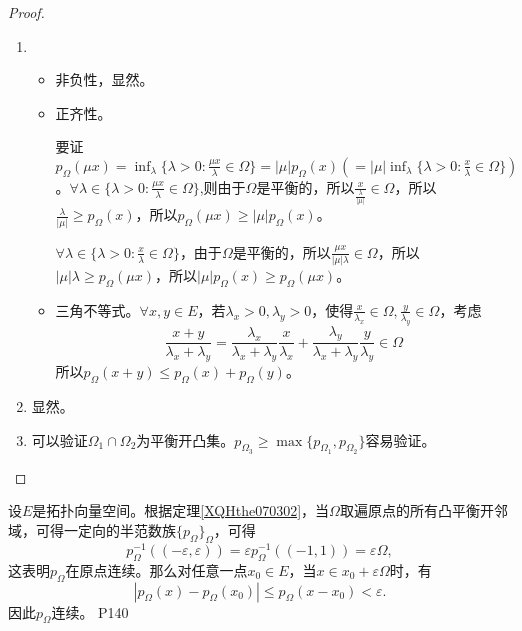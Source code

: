 \begin{proof}
	\begin{enumerate}
		\item \begin{itemize}
			\item 非负性，显然。
			\item 正齐性。\par
			要证$p_{\Omega}(\mu x) =\inf_{\lambda}\{\lambda>0:\frac{\mu x}{\lambda}\in \Omega \}=|\mu|p_{\Omega}(x)(=|\mu|\inf_{\lambda}\{\lambda>0:\frac{x}{\lambda}\in \Omega\})$。$\forall \lambda \in \{\lambda>0: \frac{\mu x}{\lambda}\in \Omega\} $,则由于$\Omega $是平衡的，所以$\frac{x}{\frac{\lambda}{|\mu|}} \in \Omega$，所以$\frac{\lambda}{|\mu|} \geq p_{\Omega}(x)$，所以$p_{\Omega}(\mu x)\geq |\mu|p_{\Omega}(x) $。\par
			$\forall \lambda\in \{\lambda>0:\frac{x}{\lambda}\in \Omega\} $，由于$\Omega $是平衡的，所以$\frac{\mu x}{|\mu|\lambda}\in \Omega $，所以$|\mu|\lambda\geq p_{\Omega}(\mu x) $，所以$|\mu|p_{\Omega}(x)\geq p_{\Omega}(\mu x) $。
			\item 三角不等式。$\forall x,y\in E $，若$\lambda_{x}>0,\lambda_{y}>0$，使得$\frac{x}{\lambda_{x}}\in \Omega,\frac{y}{\lambda_{y}}\in \Omega $，考虑
			\begin{equation*}
				\frac{x+y}{\lambda_{x}+\lambda_{y}}=\frac{\lambda_{x}}{\lambda_{x}+\lambda_{y}}\frac{x}{\lambda_{x}}+\frac{\lambda_{y}}{\lambda_{x}+\lambda_{y}}\frac{y}{\lambda_{y}}\in \Omega
			\end{equation*}
		所以$p_{\Omega}(x+y)\leq p_{\Omega}(x)+p_{\Omega}(y) $。
		\end{itemize}
	\item 显然。
	\item 可以验证$\Omega_{1}\cap\Omega_{2} $为平衡开凸集。$p_{\Omega_{3}}\geq\max\{p_{\Omega_{1}},p_{\Omega_{2}}\} $容易验证。
	\end{enumerate}
\end{proof}

\original
{
	设$E$是拓扑向量空间。根据定理\ref{XQHthe070302}，当$\Omega $取遍原点的所有凸平衡开邻域，可得一定向的半范数族$\{p_{\Omega}\}_{\Omega} $，可得
	\begin{equation*}
		p_{\Omega}^{-1}((-\varepsilon,\varepsilon))=\varepsilon p_{\Omega}^{-1}((-1,1))=\varepsilon\Omega,
	\end{equation*}
	这表明$p_{\Omega} $在原点连续。那么对任意一点$ x_{0}\in E $，当$x\in x_{0}+\varepsilon \Omega $时，有
	\begin{equation*}
		|p_{\Omega}(x)-p_{\Omega}(x_{0})|\leq p_{\Omega}(x-x_{0})<\varepsilon.
	\end{equation*}
	因此$p_{\Omega}$连续。
}
{P140}

